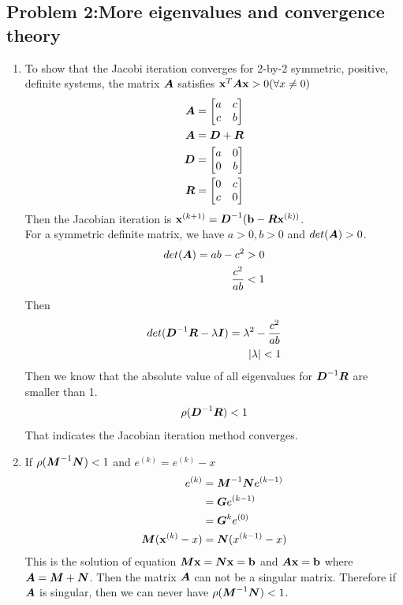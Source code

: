 \documentclass{article}
\begin{document}
\hypertarget{}{}
\subsection*{{Problem 2:More eigenvalues and convergence theory}}
\label{}

\begin{enumerate} 
\item 
To show that the Jacobi iteration converges for 2-by-2 symmetric, positive, definite systems,  the matrix $\boldsymbol{A}$ 
satisfies $\boldsymbol{\mathrm{x}}^T\boldsymbol{A}\boldsymbol{\mathrm{x}} >0 (\forall x\neq0) $ 
\begin{align*} 
\boldsymbol{A} &=\begin{bmatrix} a & c \\ c& b \end{bmatrix} \\
\boldsymbol{A} &= \boldsymbol{D} +\boldsymbol{R} \\
\boldsymbol{D} &= \begin{bmatrix} a & 0 \\ 0 & b \end{bmatrix} \\
\boldsymbol{R} & = \begin{bmatrix} 0 & c \\ c & 0  \end{bmatrix} \\
\end{align*} 
Then the Jacobian iteration is $ \boldsymbol{\mathrm{x}}^{(k+1)} = \boldsymbol{D}^{-1} (\boldsymbol{\mathrm{b}}-\boldsymbol{R}\boldsymbol{\mathrm{x}}^{(k))}$. \\ 
For a symmetric definite matrix, we have $a>0, b>0$ and $det(\boldsymbol{A})>0$. \\
\begin{align*}
det(\boldsymbol{A}) = ab-c^2 >0 \\
\frac{c^2}{ab}<1 \\
\end{align*}
Then  \begin{align*} 
det(\boldsymbol{D}^{-1}\boldsymbol{R}-\lambda \boldsymbol{I}) = \lambda^2-\frac{c^2}{ab} \\
|\lambda|<1 
\end{align*} 
Then we know that the absolute value of all eigenvalues for $\boldsymbol{D}^{-1}\boldsymbol{R}$ are smaller than 1. \\
\begin{align*} 
\rho(\boldsymbol{D}^{-1}\boldsymbol{R})<1\\
\end{align*}
That indicates the Jacobian iteration method converges. \\

\item 
If $\rho(\boldsymbol{M}^{-1}\boldsymbol{N})<1$  and $e^{(k)} = e^{(k)} -x$ 
\begin{align*} 
e^{(k)} &=\boldsymbol{M}^{-1}\boldsymbol{N} e^{(k-1)} \\
& = \boldsymbol{G} e^{(k-1)} \\
& = \boldsymbol{G}^ke^{(0)} \\
\boldsymbol{M}(\boldsymbol{\mathrm{x}}^{(k)}-x)  &= \boldsymbol{N}(x^{(k-1)}-x)
\end{align*} 
This is the solution of equation $\boldsymbol{M}\boldsymbol{\mathrm{x}} = \boldsymbol{N}\boldsymbol{\mathrm{x}} = \boldsymbol{\mathrm{b}} $ and $\boldsymbol{A}\boldsymbol{\mathrm{x}} = \boldsymbol{\mathrm{b}}$ where $\boldsymbol{A}=\boldsymbol{M}+\boldsymbol{N}$.  
Then the matrix $\boldsymbol{A}$ can not be a singular matrix. Therefore if $\boldsymbol{A}$ is singular, then we can never have $\rho(\boldsymbol{M}^{-1}\boldsymbol{N})<1$. \\
 


\end{enumerate} 
\end{document}
